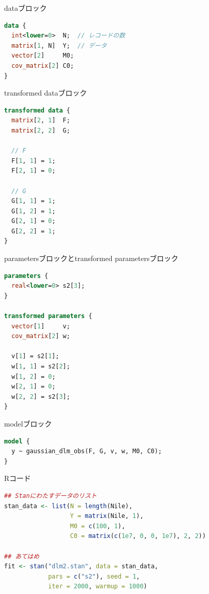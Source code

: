 \documentclass[dvipdfmx,12pt]{beamer}
\begin{document}
\begin{frame}[fragile]{dataブロック}
  \begin{lstlisting}[language=Stan]
data {
  int<lower=0>  N;  // レコードの数
  matrix[1, N]  Y;  // データ
  vector[2]     M0;
  cov_matrix[2] C0;
}
  \end{lstlisting}
\end{frame}

\begin{frame}[fragile]{transformed dataブロック}
  \begin{lstlisting}[language=Stan]
transformed data {
  matrix[2, 1]  F;
  matrix[2, 2]  G;

  // F
  F[1, 1] = 1;
  F[2, 1] = 0;

  // G
  G[1, 1] = 1;
  G[1, 2] = 1;
  G[2, 1] = 0;
  G[2, 2] = 1;
}
  \end{lstlisting}
\end{frame}

\begin{frame}[fragile]{parametersブロックとtransformed parametersブロック}
  \begin{lstlisting}[language=Stan]
parameters {
  real<lower=0> s2[3];
}

transformed parameters {
  vector[1]     v;
  cov_matrix[2] w;

  v[1] = s2[1];
  w[1, 1] = s2[2];
  w[1, 2] = 0;
  w[2, 1] = 0;
  w[2, 2] = s2[3];
}
  \end{lstlisting}
\end{frame}

\begin{frame}[fragile]{modelブロック}
  \begin{lstlisting}[language=Stan]
model {
  y ~ gaussian_dlm_obs(F, G, v, w, M0, C0);
}
  \end{lstlisting}
\end{frame}

\begin{frame}[fragile]{Rコード}
  \begin{lstlisting}[language=R]
## Stanにわたすデータのリスト
stan_data <- list(N = length(Nile),
                  Y = matrix(Nile, 1),
                  M0 = c(100, 1),
                  C0 = matrix(c(1e7, 0, 0, 1e7), 2, 2))

## あてはめ
fit <- stan("dlm2.stan", data = stan_data,
            pars = c("s2"), seed = 1,
            iter = 2000, warmup = 1000)
  \end{lstlisting}
\end{frame}
\end{document}
